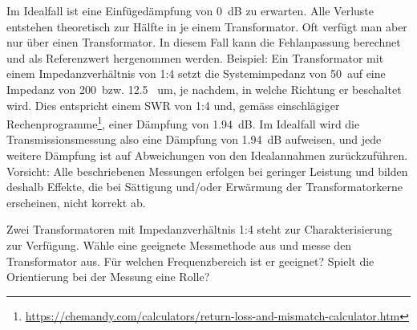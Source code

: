 \documentclass[a4paper,11pt,parskip=half,headings=small,DIV=11,notitlepage,abstract=on]{scrartcl}
\begin{document}
Im Idealfall ist eine Einfügedämpfung von 0~dB zu erwarten. Alle Verluste entstehen
theoretisch zur Hälfte in je einem Transformator. Oft verfügt man aber nur über einen
Transformator. In diesem Fall kann die Fehlanpassung berechnet und als Referenzwert
hergenommen werden. Beispiel: Ein Transformator mit einem Impedanzverhältnis von 1:4
setzt die Systemimpedanz von 50~\Ohm auf eine Impedanz von 200~\Ohm bzw. 12.5~\Ohm
um, je nachdem, in welche Richtung er beschaltet wird. Dies entspricht einem SWR von
1:4 und, gemäss einschlägiger Rechenprogramme\footnote{\url{https://chemandy.com/calculators/return-loss-and-mismatch-calculator.htm}},
einer Dämpfung von 1.94~dB. Im Idealfall wird die Transmissionsmessung also eine
Dämpfung von 1.94~dB aufweisen, und jede weitere Dämpfung ist auf Abweichungen von
den Idealannahmen zurückzuführen. Vorsicht: Alle beschriebenen Messungen erfolgen bei
geringer Leistung und bilden deshalb Effekte, die bei Sättigung und/oder Erwärmung
der Transformatorkerne erscheinen, nicht korrekt ab.

Zwei Transformatoren mit Impedanzverhältnis 1:4 steht zur Charakterisierung zur
Verfügung. Wähle eine geeignete Messmethode aus und messe den Transformator aus.
Für welchen Frequenzbereich ist er geeignet? Spielt die Orientierung bei der Messung
eine Rolle?
\end{document}
